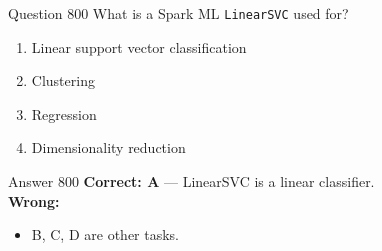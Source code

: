 \documentclass[aspectratio=169,11pt]{beamer}
\begin{document}
	\begin{frame}{Question 800}
		What is a Spark ML \texttt{LinearSVC} used for?
		\begin{enumerate}[label=\Alph*.]
			\item Linear support vector classification
			\item Clustering
			\item Regression
			\item Dimensionality reduction
		\end{enumerate}
	\end{frame}
	\begin{frame}{Answer 800}
		\textbf{Correct: A} --- LinearSVC is a linear classifier.\\
		\vspace{0.5em}
		\textbf{Wrong:}
		\begin{itemize}
			\item B, C, D are other tasks.
		\end{itemize}
	\end{frame}
	
\end{document}
